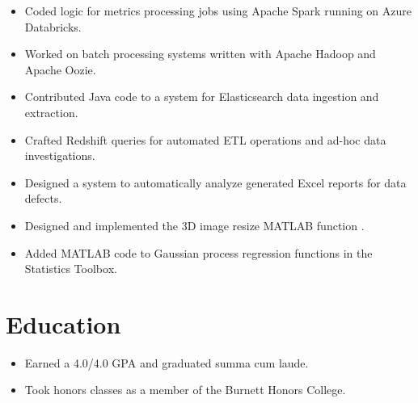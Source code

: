 \documentclass[letterpaper]{resume}
\begin{document}
\begin{minipage}[t]{0.77\columnwidth}
\sectionspace

\vspace{2pt}
\begin{itemize}
\item Coded logic for metrics processing jobs using Apache Spark running on Azure Databricks.
\item Worked on batch processing systems written with Apache Hadoop and Apache Oozie.
\end{itemize}

\sectionspace

\vspace{2pt}
\begin{itemize}
\item Contributed Java code to a system for Elasticsearch data ingestion and extraction.
\item Crafted Redshift queries for automated ETL operations and ad-hoc data investigations.
\item Designed a system to automatically analyze generated Excel reports for data defects.
\end{itemize}

\sectionspace

\vspace{2pt}
\begin{itemize}
\item Designed and implemented the 3D image resize MATLAB function .
\item Added MATLAB code to Gaussian process regression functions in the Statistics Toolbox.
\end{itemize}

\sectionspace


\section{Education}

\vspace{2pt}
\begin{itemize}
\item Earned a 4.0/4.0 GPA and graduated summa cum laude.
\item Took honors classes as a member of the Burnett Honors College.
\end{itemize}


\end{minipage}
\end{document}
